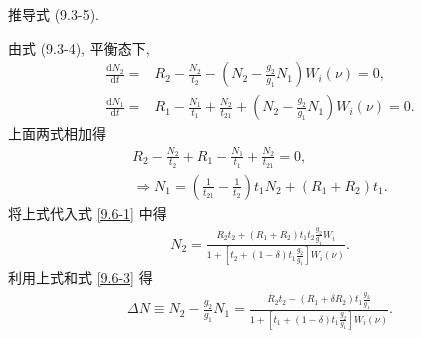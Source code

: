\documentclass{note}
\begin{document}
\begin{exe}
    推导式 (9.3-5).
\end{exe}
\begin{pf}
    由式 (9.3-4), 平衡态下,
    \begin{align}
        \label{9.6-1}
        \frac{\mathrm{d}N_2}{\mathrm{d}t}=&R_2-\frac{N_2}{t_2}-\left(N_2-\frac{g_2}{g_1}N_1\right)W_i(\nu)=0,\\
        \label{9.6-2}
        \frac{\mathrm{d}N_1}{\mathrm{d}t}=&R_1-\frac{N_1}{t_1}+\frac{N_2}{t_{21}}+\left(N_2-\frac{g_2}{g_1}N_1\right)W_i(\nu)=0.
    \end{align}
    上面两式相加得
    \begin{gather}
        R_2-\frac{N_2}{t_2}+R_1-\frac{N_1}{t_1}+\frac{N_2}{t_{21}}=0,\\
        \label{9.6-3}
        \Longrightarrow N_1=\left(\frac{1}{t_{21}}-\frac{1}{t_2}\right)t_1N_2+(R_1+R_2)t_1.
    \end{gather}
    将上式代入式 \eqref{9.6-1} 中得
    \begin{align}
        N_2=\frac{R_2t_2+(R_1+R_2)t_1t_2\frac{g_2}{g_1}W_i}{1+\left[t_2+(1-\delta)t_1\frac{g_2}{g_1}\right]W_i(\nu)}.
    \end{align}
    利用上式和式 \eqref{9.6-3} 得
    \begin{align}
        \Delta N\equiv N_2-\frac{g_2}{g_1}N_1=\frac{R_2t_2-(R_1+\delta R_2)t_1\frac{g_2}{g_1}}{1+\left[t_1+(1-\delta)t_1\frac{g_2}{g_1}\right]W_i(\nu)}.
    \end{align}
\end{pf}
\ifx\allfiles\undefined
\end{document}
